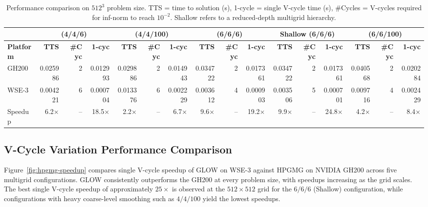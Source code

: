 \documentclass[conference]{IEEEtran}
\begin{document}
\begin{table}[t]
    \caption{Performance comparison on $512^3$ problem size. TTS = time to solution (s), 1-cycle = single V-cycle time (s), \#Cycles = V-cycles required for inf-norm to reach $10^{-2}$. Shallow refers to a reduced-depth multigrid hierarchy.}
    \label{tab:platform_comparison}
    \centering
    \footnotesize
    \setlength{\tabcolsep}{3pt}
    \begin{tabular}{|l||r|r|r||r|r|r||r|r|r||r|r|r||r|r|r|} \hline
        & \multicolumn{3}{c||}{\textbf{(4/4/6)}}
        & \multicolumn{3}{c||}{\textbf{(4/4/100)}}
        & \multicolumn{3}{c||}{\textbf{(6/6/6)}}
        & \multicolumn{3}{c||}{\textbf{Shallow (6/6/6)}}
        & \multicolumn{3}{c|}{\textbf{(6/6/100)}} \\ \hline
        \textbf{Platform} & \textbf{TTS} & \textbf{\#Cyc} & \textbf{1-cyc}
                          & \textbf{TTS} & \textbf{\#Cyc} & \textbf{1-cyc}
                          & \textbf{TTS} & \textbf{\#Cyc} & \textbf{1-cyc}
                          & \textbf{TTS} & \textbf{\#Cyc} & \textbf{1-cyc}
                          & \textbf{TTS} & \textbf{\#Cyc} & \textbf{1-cyc} \\ \hline \hline
        GH200   & 0.025986 & 2 & 0.012993
                & 0.029886 & 2 & 0.014943
                & 0.034722 & 2 & 0.017361
                & 0.034722 & 2 & 0.017361
                & 0.040568 & 2 & 0.020284 \\ \hline
        WSE-3   & 0.004221 & 6 & 0.000704
                & 0.013376 & 6 & 0.002229
                & 0.003612 & 4 & 0.000903
                & 0.003506 & 5 & 0.000701
                & 0.009716 & 4 & 0.002429 \\ \hline \hline
        Speedup & 6.2$\times$ & -- & 18.5$\times$
                & 2.2$\times$ & -- &  6.7$\times$
                & 9.6$\times$ & -- & 19.2$\times$
                & 9.9$\times$ & -- & 24.8$\times$
                & 4.2$\times$ & -- &  8.4$\times$ \\ \hline
    \end{tabular}
\end{table}

        \subsection{V-Cycle Variation Performance Comparison}
            Figure~\ref{fig:hpgmg-speedup} compares single V-cycle speedup of GLOW on WSE-3 against HPGMG on NVIDIA GH200 across five multigrid configurations. GLOW consistently outperforms the GH200 at every problem size, with speedups increasing as the grid scales. The best single V-cycle speedup of approximately $25\times$ is observed at the $512{\times}512$ grid for the $6/6/6$ (Shallow) configuration, while configurations with heavy coarse-level smoothing such as $4/4/100$ yield the lowest speedups.
\end{document}
